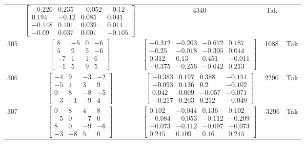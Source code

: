 \documentclass[a4paper,12pt]{article}
\begin{document}
\begin{tabular}{c c c c c}
&
$\begin{bmatrix} -0.226 & 0.235 & -0.052 & -0.12 \\ 0.194 & -0.12 & 0.085 & 0.041 \\ -0.148 & 0.101 & 0.039 & 0.011 \\ -0.09 & 0.037 & 0.001 & -0.105 \end{bmatrix}$
&
4340
&
Tak
\\
305
&
$\begin{bmatrix} 8 & -5 & 0 & -6 \\ 5 & 9 & 5 & -6 \\ -7 & 1 & 1 & 6 \\ -1 & 5 & 9 & 5 \end{bmatrix}$
&
$\begin{bmatrix} -0.312 & -0.203 & -0.672 & 0.187 \\ -0.25 & -0.018 & -0.305 & 0.044 \\ 0.312 & 0.13 & 0.451 & -0.011 \\ -0.375 & -0.256 & -0.642 & 0.213 \end{bmatrix}$
&
1088
&
Tak
\\
306
&
$\begin{bmatrix} -4 & 9 & -3 & -2 \\ -5 & 1 & 3 & 9 \\ 0 & 8 & -8 & -5 \\ -3 & -1 & -9 & 4 \end{bmatrix}$
&
$\begin{bmatrix} -0.383 & 0.197 & 0.388 & -0.151 \\ -0.093 & 0.136 & 0.2 & -0.102 \\ 0.042 & 0.009 & -0.057 & -0.071 \\ -0.217 & 0.203 & 0.212 & -0.049 \end{bmatrix}$
&
2290
&
Tak
\\
307
&
$\begin{bmatrix} 0 & 8 & 4 & 8 \\ -5 & 0 & -7 & 0 \\ 8 & 0 & -9 & -6 \\ -3 & -8 & 5 & 0 \end{bmatrix}$
&
$\begin{bmatrix} 0.102 & -0.044 & 0.136 & 0.102 \\ -0.084 & -0.053 & -0.112 & -0.209 \\ -0.073 & -0.112 & -0.097 & -0.073 \\ 0.245 & 0.109 & 0.16 & 0.245 \end{bmatrix}$
&
-3296
&
Tak
\\

\end{tabular}
\end{document}
